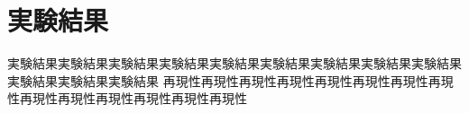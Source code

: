 \section{実験結果}

実験結果実験結果実験結果実験結果実験結果実験結果実験結果実験結果実験結果実験結果実験結果実験結果
再現性再現性再現性再現性再現性再現性再現性再現性再現性再現性再現性再現性再現性再現性
